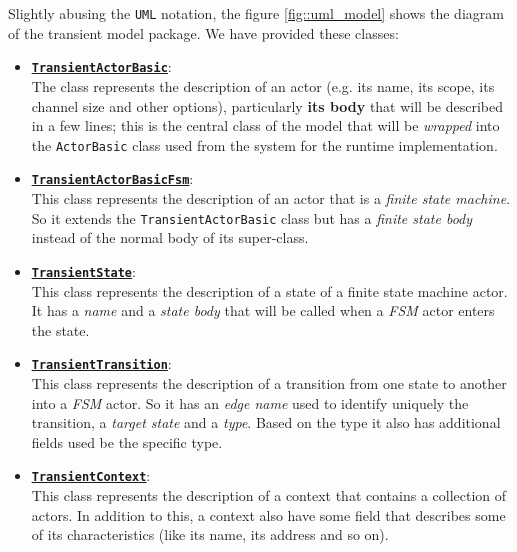 Slightly abusing the \texttt{UML} notation, the figure \ref{fig::uml_model} shows the diagram of the transient model package. We have provided these classes:
\begin{itemize}
	\item \href{https://github.com/LM-96/QA-Extensions/blob/main/it.unibo.qakactor/src/main/kotlin/model/TransientActorBasic.kt}{\underline{\textbf{\texttt{TransientActorBasic}}}}:\\
	The class represents the description of an actor (e.g. its name, its scope, its channel size and other options), particularly \textbf{its body} that will be described in a few lines; this is the central class of the model that will be \textit{wrapped} into the \texttt{ActorBasic} class used from the system for the runtime implementation.
	
	\item \href{https://github.com/LM-96/QA-Extensions/blob/main/it.unibo.qakactor/src/main/kotlin/model/TransientActorBasicFsm.kt}{\underline{\textbf{\texttt{TransientActorBasicFsm}}}}:\\
	This class represents the description of an actor that is a \textit{finite state machine}. So it extends the \texttt{TransientActorBasic} class but has a \textit{finite state body} instead of the normal body of its super-class.
	
	\item
	\href{https://github.com/LM-96/QA-Extensions/blob/main/it.unibo.qakactor/src/main/kotlin/model/TransientState.kt}{\underline{\textbf{\texttt{TransientState}}}}:\\
	This class represents the description of a state of a finite state machine actor. It has a 	\textit{name} and a \textit{state body} that will be called when a \textit{FSM} actor enters the state.
	
	\item
	\href{https://github.com/LM-96/QA-Extensions/blob/main/it.unibo.qakactor/src/main/kotlin/model/TransitentTransition.kt}{\underline{\textbf{\texttt{TransientTransition}}}}:\\
	This class represents the description of a transition from one state to another into a \textit{FSM} actor. So it has an \textit{edge name} used to identify uniquely the transition, a \textit{target state} and a \textit{type}. Based on the type it also has additional fields used be the specific type.
	
	\item 
	\href{https://github.com/LM-96/QA-Extensions/blob/main/it.unibo.qakactor/src/main/kotlin/model/TransientContext.kt}{\underline{\textbf{\texttt{TransientContext}}}}:\\
	This class represents the description of a context that contains a collection of actors. In addition to this, a context also have some field that describes some of its characteristics (like its name, its address and so on).
	

\end{itemize}
